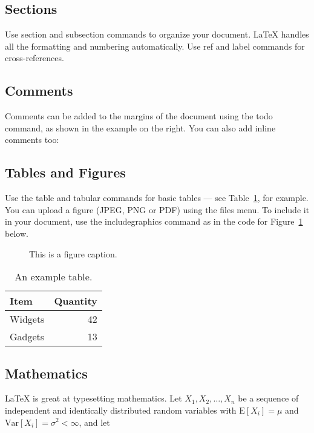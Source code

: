\documentclass[12pt]{article}
\begin{document}
\subsection{Sections}

Use section and subsection commands to organize your document. \LaTeX{} handles all the formatting and numbering automatically. Use ref and label commands for cross-references.

\subsection{Comments}

Comments can be added to the margins of the document using the  todo command, as shown in the example on the right. You can also add inline comments too:


\subsection{Tables and Figures}

Use the table and tabular commands for basic tables --- see Table~\ref{tab:widgets}, for example. You can upload a figure (JPEG, PNG or PDF) using the files menu. To include it in your document, use the includegraphics command as in the code for Figure~\ref{fig:frog} below.

\begin{figure}
\centering
\caption{\label{fig:frog}This is a figure caption.}
\end{figure}

\begin{table}
\centering
\begin{tabular}{l|r}
Item & Quantity \\\hline
Widgets & 42 \\
Gadgets & 13
\end{tabular}
\caption{\label{tab:widgets}An example table.}
\end{table}

\subsection{Mathematics}

\LaTeX{} is great at typesetting mathematics. Let $X_1, X_2, \ldots, X_n$ be a sequence of independent and identically distributed random variables with $\text{E}[X_i] = \mu$ and $\text{Var}[X_i] = \sigma^2 < \infty$, and let
\end{document}
